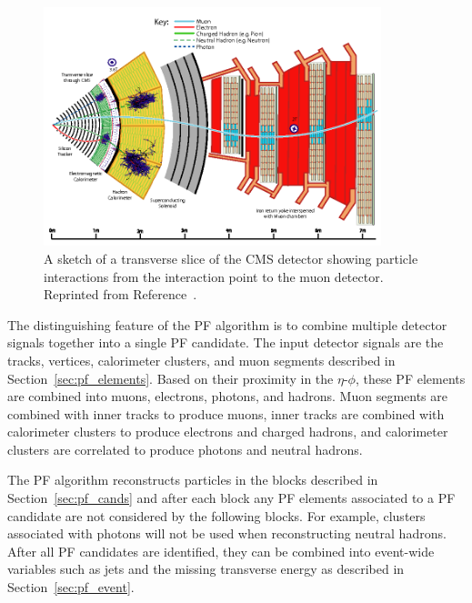 \begin{figure}[htbp]
  \begin{center}
    \includegraphics[width=0.875\textwidth]{Reconstruction/Figures/cms_slice.png}
    \caption{
      A sketch of a transverse slice of the CMS detector showing particle interactions from the interaction point to the muon detector.
      Reprinted from Reference~\cite{}. %
    }
    \label{fig:cms_slice}
  \end{center}
\end{figure}

The distinguishing feature of the PF algorithm is to combine multiple detector signals together into a single PF candidate.
The input detector signals are the tracks, vertices, calorimeter clusters, and muon segments described in Section~\ref{sec:pf_elements}.
Based on their proximity in the $\eta$-$\phi$, these PF elements are combined into muons, electrons, photons, and hadrons.
Muon segments are combined with inner tracks to produce muons, inner tracks are combined with calorimeter clusters to produce electrons and charged hadrons, and calorimeter clusters are correlated to produce photons and neutral hadrons.

The PF algorithm reconstructs particles in the blocks described in Section~\ref{sec:pf_cands} and after each block any PF elements associated to a PF candidate are not considered by the following blocks.
For example, clusters associated with photons will not be used when reconstructing neutral hadrons.
After all PF candidates are identified, they can be combined into event-wide variables such as jets and the missing transverse energy as described in Section~\ref{sec:pf_event}. 

